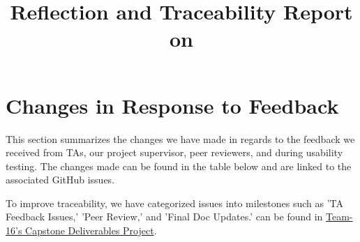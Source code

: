 \documentclass{article}
\title{Reflection and Traceability Report on \progname}
\author{\authname}
\date{}
\begin{document}
\maketitle
\newpage
\tableofcontents
\newpage

\section{Changes in Response to Feedback}

This section summarizes the changes we have made in regards to the feedback we received from TAs, our project supervisor, peer reviewers, and during usability testing. The changes made can be found in the table below and are linked to the associated GitHub issues.

To improve traceability, we have categorized issues into milestones such as 'TA Feedback Issues,' 'Peer Review,' and 'Final Doc Updates.' can be found in \href{https://github.com/harrisonchiu/xray}{Team-16's Capstone Deliverables Project}.
\end{document}
